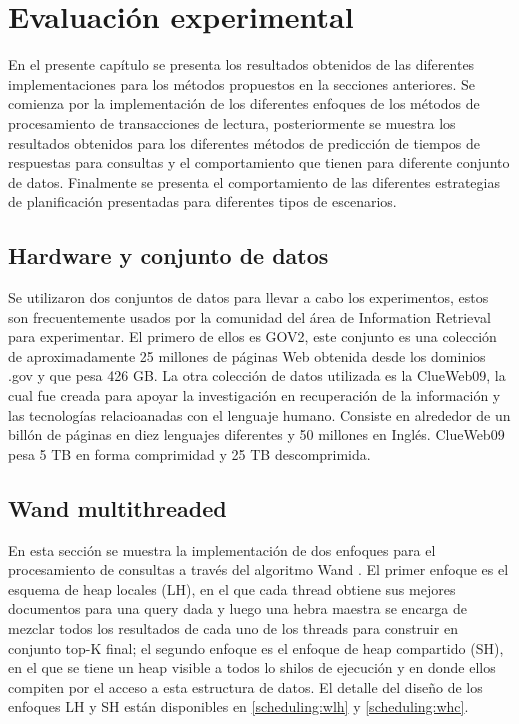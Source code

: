 \chapter{Evaluación experimental}
\label{cap:evaluacionexperimental}

En el presente capítulo se presenta los resultados obtenidos de las diferentes implementaciones para los métodos propuestos en la secciones anteriores. Se comienza por la implementación de los diferentes enfoques de los métodos de procesamiento de transacciones de lectura, posteriormente se muestra los resultados obtenidos para los diferentes métodos de predicción de tiempos de respuestas para consultas y el comportamiento que tienen para diferente conjunto de datos. Finalmente se presenta el comportamiento de las diferentes estrategias de planificación presentadas para diferentes tipos de escenarios.


\section{Hardware y conjunto de datos}
\label{evaluacionexperimental:hardwareydatos}

Se utilizaron dos conjuntos de datos para llevar a cabo los experimentos, estos son frecuentemente usados por la comunidad del área de Information Retrieval para experimentar. El primero de ellos es GOV2, este conjunto es una colección de aproximadamente 25 millones de páginas Web obtenida desde los dominios .gov y que pesa 426 GB. La otra colección de datos utilizada es la ClueWeb09, la cual fue creada para apoyar la investigación en recuperación de la información y las tecnologías relacioanadas con el lenguaje humano. Consiste en alrededor de un billón de páginas en diez lenguajes diferentes y 50 millones en Inglés. ClueWeb09 pesa 5 TB en forma comprimidad y 25 TB descomprimida. 




\section{Wand multithreaded}
\label{evaluacionexperimental:wm}
En esta sección se muestra la implementación de dos enfoques para el procesamiento de consultas a través del algoritmo Wand \citep{Broder:2003}. El primer enfoque es el esquema de heap locales (LH), en el que cada thread obtiene sus mejores documentos para una query dada y luego una hebra maestra se encarga de mezclar todos los resultados de cada uno de los threads para construir en conjunto top-K final; el segundo enfoque es el enfoque de heap compartido (SH), en el que se tiene un heap visible a todos lo shilos de ejecución y en donde ellos compiten por el acceso a esta estructura de datos. El detalle del diseño de los enfoques LH y SH están disponibles en \ref{scheduling:wlh} y \ref{scheduling:whc}. 

